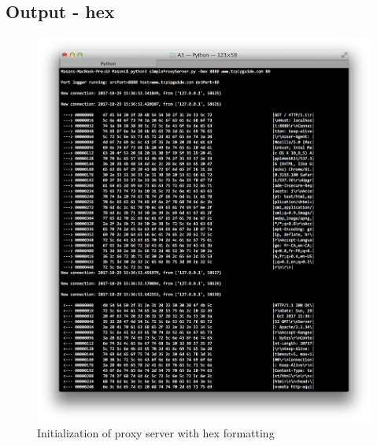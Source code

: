 \documentclass[11pt]{article}
\begin{document}
	\subsection{Output - hex}
	\begin{figure}[H]
	\includegraphics[scale=0.5, trim={0cm 0cm 0cm 0cm}, clip]{hex_output}
	\caption{Initialization of proxy server with hex formatting}
	\end{figure}
	
\end{document}
